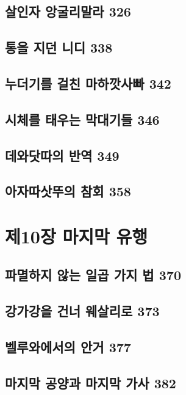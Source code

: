 \documentclass[12pt, a4paper, oneside]{book}
\let\stdsection\section
\renewcommand\section{\newpage\stdsection}
\begin{document}
	\section{살인자 앙굴리말라 326 }

	\section{통을 지던 니디 338 }

	\section{누더기를 걸친 마하깟사빠 342 }

	\section{시체를 태우는 막대기들 346 }

	\section{데와닷따의 반역 349 }

	\section{아자따삿뚜의 참회 358}


	\chapter{제10장 마지막 유행}
	\noptcrule
	\parttoc				


	\section{파멸하지 않는 일곱 가지 법 370 }

	\section{강가강을 건너 웨살리로 373 }

	\section{벨루와에서의 안거 377 }

	\section{마지막 공양과 마지막 가사 382 }
\end{document}
